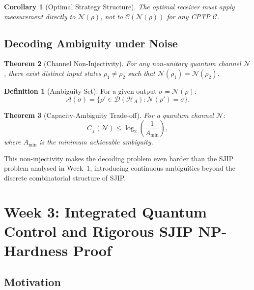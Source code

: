 \documentclass[journal,twocolumn]{IEEEtran}
\theoremstyle{definition}
\newtheorem{definition}{Definition}[section]
\theoremstyle{plain}
\newtheorem{theorem}{Theorem}[section]
\newtheorem{corollary}[theorem]{Corollary}
\begin{document}
\begin{corollary}[Optimal Strategy Structure]
The optimal receiver must apply measurement directly to
$\mathcal{N}(\rho)$, not to $\mathcal{C}(\mathcal{N}(\rho))$ for any
CPTP $\mathcal{C}$.
\end{corollary}

\subsection{Decoding Ambiguity under Noise}

\begin{theorem}[Channel Non-Injectivity]
For any non-unitary quantum channel $\mathcal{N}$, there exist distinct
input states $\rho_1\ne\rho_2$ such that
$\mathcal{N}(\rho_1)=\mathcal{N}(\rho_2)$.
\end{theorem}

\begin{definition}[Ambiguity Set]
For a given output $\sigma=\mathcal{N}(\rho)$:
\begin{equation}
  \mathcal{A}(\sigma)=\{\rho'\in\mathcal{D}(\mathcal{H}_A)
  :\mathcal{N}(\rho')=\sigma\}.
\end{equation}
\end{definition}

\begin{theorem}[Capacity-Ambiguity Trade-off]
\label{thm:cap_ambiguity}
For a quantum channel $\mathcal{N}$:
\begin{equation}
  C_\chi(\mathcal{N})\le\log_2\!\left(\frac{1}{A_{\min}}\right),
\end{equation}
where $A_{\min}$ is the minimum achievable ambiguity.
\end{theorem}

This non-injectivity makes the decoding problem even harder than the
SJIP problem analysed in Week~1, introducing continuous ambiguities
beyond the discrete combinatorial structure of SJIP.

\section{Week 3: Integrated Quantum Control and Rigorous SJIP NP-Hardness Proof}

\subsection{Motivation}
\end{document}
